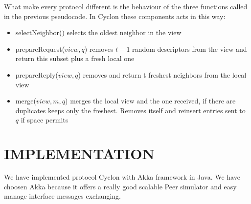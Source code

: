\documentclass[a4paper,12pt,notitlepage]{article} %
\begin{document}
\begin{algorithm}[H]
\SetAlgoLined
{}

\BlankLine
{}
\BlankLine

\BlankLine

\BlankLine
\end{algorithm}

What make every protocol different is the behaviour of
 the three functions called in the previous pseudocode. In Cyclon these components acts
 in this way:

\begin{itemize}
	\item selectNeighbor() selects the oldest neighbor in the view
	\item prepareRequest(\(view, q\)) removes \(t-1\) random descriptors from the view and return this 
	subset plus a fresh local one
	\item prepareReply(\(view, q\)) removes and return t freshest neighbors from the local view
	\item merge(\(view, m, q\)) merges the local view and the one received, if there are duplicates keeps only the 
	freshest. Removes itself and reinsert entries sent to \(q\) if space permits
\end{itemize}






\section{IMPLEMENTATION}

We have implemented protocol Cyclon with Akka framework in Java.
We have choosen Akka because it offers a really good scalable Peer simulator and easy manage interface messages exchanging.
\end{document}
